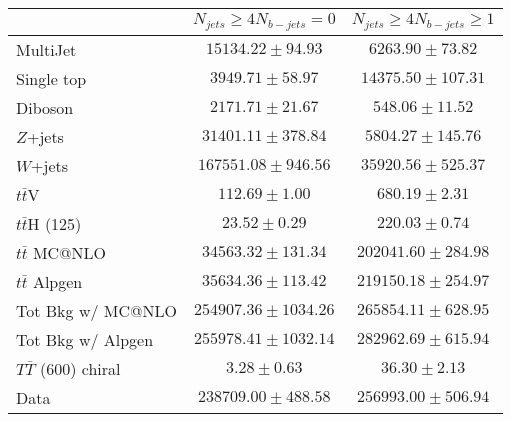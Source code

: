 \begin{tabular}{l c c } \toprule\toprule
 & $N_{jets}\geq 4$$N_{b-jets}= 0$ 		 & $N_{jets}\geq 4$$N_{b-jets}\geq 1$ 		 \\ \midrule 
  MultiJet  & $15134.22 \pm 94.93$  & $6263.90 \pm 73.82$ \\ 
 Single top  & $3949.71 \pm 58.97$  & $14375.50 \pm 107.31$ \\ 
 Diboson  & $2171.71 \pm 21.67$  & $548.06 \pm 11.52$ \\ 
 $Z$+jets  & $31401.11 \pm 378.84$  & $5804.27 \pm 145.76$ \\ 
 $W$+jets  & $167551.08 \pm 946.56$  & $35920.56 \pm 525.37$ \\ 
 $t\bar{t}$V  & $112.69 \pm 1.00$  & $680.19 \pm 2.31$ \\ 
 $t\bar{t}$H (125)  & $23.52 \pm 0.29$  & $220.03 \pm 0.74$ \\ 
 $t\bar{t}$ MC@NLO  & $34563.32 \pm 131.34$  & $202041.60 \pm 284.98$ \\ 
 $t\bar{t}$ Alpgen  & $35634.36 \pm 113.42$  & $219150.18 \pm 254.97$ \\ 
\midrule 
  Tot Bkg w/ MC@NLO  & $254907.36 \pm 1034.26$  & $265854.11 \pm 628.95$ \\ \midrule 
 \midrule 
  Tot Bkg w/ Alpgen  & $255978.41 \pm 1032.14$  & $282962.69 \pm 615.94$ \\ \midrule 
  $T\bar{T}$ (600) chiral  & $3.28 \pm 0.63$  & $36.30 \pm 2.13$ \\ 
 Data  & $238709.00 \pm 488.58$  & $256993.00 \pm 506.94$ \\ 
\bottomrule\end{tabular}